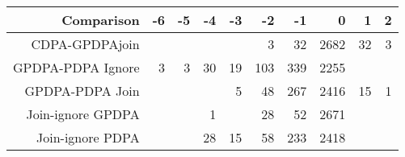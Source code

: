 \begin{tabular}{rrrrrrrrrr}
  \hline
Comparison & -6 & -5 & -4 & -3 & -2 & -1 & 0 & 1 & 2 \\ 
  \hline
CDPA-GPDPAjoin &  &  &  &  & 3 & 32 & 2682 & 32 & 3 \\ 
  GPDPA-PDPA Ignore & 3 & 3 & 30 & 19 & 103 & 339 & 2255 &  &  \\ 
  GPDPA-PDPA Join &  &  &  & 5 & 48 & 267 & 2416 & 15 & 1 \\ 
  Join-ignore GPDPA &  &  & 1 &  & 28 & 52 & 2671 &  &  \\ 
  Join-ignore PDPA &  &  & 28 & 15 & 58 & 233 & 2418 &  &  \\ 
   \hline
\end{tabular}
